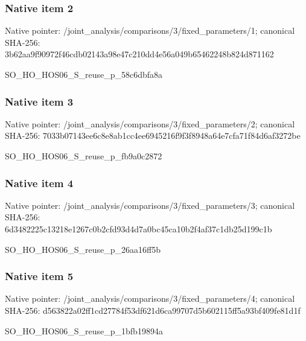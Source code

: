 \documentclass[10pt,a4paper]{article}
\begin{document}
\subsubsection{Native item 2}
Native pointer: /joint\_\allowbreak{}analysis/comparisons/3/fixed\_\allowbreak{}parameters/1; canonical SHA-256: 3b62aa9f90972f46cdb02143a98e47c210dd4e56a049b65462248b824d871162

\begingroup\raggedright\sloppy SO\_\allowbreak{}HO\_\allowbreak{}HOS06\_\allowbreak{}S\_\allowbreak{}reuse\_\allowbreak{}p\_\allowbreak{}58c6dbfa8a\par\endgroup

\subsubsection{Native item 3}
Native pointer: /joint\_\allowbreak{}analysis/comparisons/3/fixed\_\allowbreak{}parameters/2; canonical SHA-256: 7033b07143ee6c8e8ab1cc4ee6945216f9f3f8948a64e7cfa71f84d6af3272be

\begingroup\raggedright\sloppy SO\_\allowbreak{}HO\_\allowbreak{}HOS06\_\allowbreak{}S\_\allowbreak{}reuse\_\allowbreak{}p\_\allowbreak{}fb9a0c2872\par\endgroup

\subsubsection{Native item 4}
Native pointer: /joint\_\allowbreak{}analysis/comparisons/3/fixed\_\allowbreak{}parameters/3; canonical SHA-256: 6d3482225c13218e1267c0b2cfd93d4d7a0bc45ca10b2f4af37c1db25d199c1b

\begingroup\raggedright\sloppy SO\_\allowbreak{}HO\_\allowbreak{}HOS06\_\allowbreak{}S\_\allowbreak{}reuse\_\allowbreak{}p\_\allowbreak{}26aa16ff5b\par\endgroup

\subsubsection{Native item 5}
Native pointer: /joint\_\allowbreak{}analysis/comparisons/3/fixed\_\allowbreak{}parameters/4; canonical SHA-256: d563822a02ff1cd27784f53df621d6ca99707d5b602115ff5a93bf409fe81d1f

\begingroup\raggedright\sloppy SO\_\allowbreak{}HO\_\allowbreak{}HOS06\_\allowbreak{}S\_\allowbreak{}reuse\_\allowbreak{}p\_\allowbreak{}1bfb19894a\par\endgroup
\end{document}
